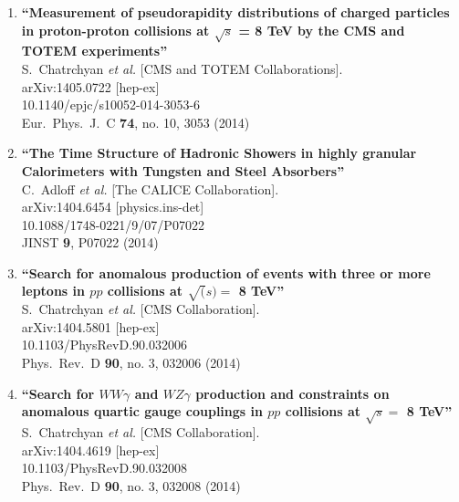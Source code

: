 \documentclass{article}
\begin{document}
\begin{enumerate}
\item%
{\bf ``Measurement of pseudorapidity distributions of charged particles in proton-proton collisions at $\sqrt{s}$ = 8 TeV by the CMS and TOTEM experiments''}
  \\{}S.~Chatrchyan {\it et al.}  [CMS and TOTEM Collaborations].
  \\{}arXiv:1405.0722 [hep-ex]
    \\{}10.1140/epjc/s10052-014-3053-6
\\{}Eur.\ Phys.\ J.\ C {\bf 74}, no. 10, 3053 (2014) %


\item%
{\bf ``The Time Structure of Hadronic Showers in highly granular Calorimeters with Tungsten and Steel Absorbers''}
  \\{}C.~Adloff {\it et al.}  [The CALICE Collaboration].
  \\{}arXiv:1404.6454 [physics.ins-det]
    \\{}10.1088/1748-0221/9/07/P07022
\\{}JINST {\bf 9}, P07022 (2014) %


\item%
{\bf ``Search for anomalous production of events with three or more leptons in $pp$ collisions at $\sqrt(s) =$ 8 TeV''}
  \\{}S.~Chatrchyan {\it et al.}  [CMS Collaboration].
  \\{}arXiv:1404.5801 [hep-ex]
    \\{}10.1103/PhysRevD.90.032006
\\{}Phys.\ Rev.\ D {\bf 90}, no. 3, 032006 (2014) %


\item%
{\bf ``Search for $WW \gamma$ and $WZ \gamma$ production and constraints on anomalous quartic gauge couplings in $pp$ collisions at $\sqrt s =$ 8 TeV''}
  \\{}S.~Chatrchyan {\it et al.}  [CMS Collaboration].
  \\{}arXiv:1404.4619 [hep-ex]
    \\{}10.1103/PhysRevD.90.032008
\\{}Phys.\ Rev.\ D {\bf 90}, no. 3, 032008 (2014) %



\end{enumerate}
\end{document}
